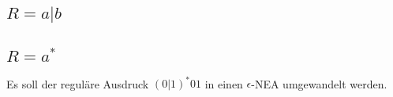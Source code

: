 \subsection[Regulärer Ausdruck: Alternative]{$R = a|b$}
\begin{figure}[H]
    \centering
    \begin{transitiongraph}[fa]
    \end{transitiongraph}
\end{figure}
\subsection[Regulärer Ausdruck: N-malige Wiederholung]{$R = a^*$}
\begin{figure}[H]
    \centering
    \begin{transitiongraph}[fa]
    \end{transitiongraph}
\end{figure}
\begin{bsp}
    Es soll der reguläre Ausdruck $(0|1)^*01$ in einen $\epsilon$-NEA umgewandelt werden.
\end{bsp}